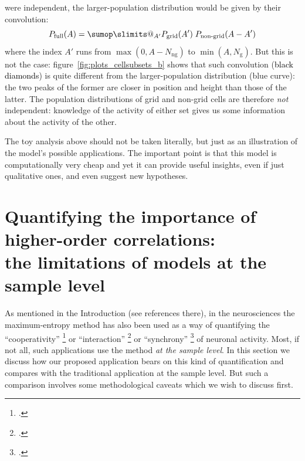\documentclass[\ifafour a4paper,12pt,\else a5paper,10pt,\fi%
onecolumn,oneside,article,%
british%
]{memoir}
\makeatletter
\theoremstyle{remark}
\theoremstyle{innote}
\def\sum{\DOTSI\sumop\slimits@}
\newcommand*{\citep}{\footcites}
\DeclarePairedDelimiter\set{\{}{\}}
\renewcommand*{\|}{\nonscript\,\vert\nonscript\;\mathopen{}}
\newcommand*{\eg}{{e.g.}}
\newcommand*{\yAv}{A}
\newcommand*{\yNg}{N_{\text{g}}}
\newcommand*{\yNng}{N_{\text{ng}}}
\newcommand*{\yA}{\yAv}%
\makeatother
\begin{document}
were independent, the larger-population distribution would be given by
their convolution:
\begin{equation}
  \label{eq:convolution}
  P_{\text{full}}(\yA) = \sum_{\yA'} P_{\text{grid}}(\yA')\;
  P_{\text{non-grid}}(\yA-\yA') %
\end{equation}
where the index $\yA'$ runs from $\max(0,\yA-\yNng)$ to $\min(\yA,\yNg)$.
But this is not the case: 
figure~\ref{fig:plots_cellsubsets_b} shows that such convolution
(\textcolor{black}{black diamonds}) is quite different from the
larger-population distribution (\textcolor{myblue}{blue curve}): the two
peaks of the former are closer in position and height than those of the
latter. The population distributions of grid and non-grid cells are
therefore \emph{not} independent: knowledge of the activity of either set
gives us some information about the activity of the other.

\medskip

The toy analysis above should not be taken literally, but just as an
illustration of the model's possible applications. The important point is
that this model is computationally very cheap and yet it can provide
useful insights, even if just qualitative ones, and even suggest new
hypotheses.




\section{Quantifying the importance of higher-order correlations:\\
  the limitations of models at the sample level}
\label{sec:marginalization}

As mentioned in the Introduction (see references there), in the
neurosciences the maximum-entropy method has also been used as a way of
quantifying the \enquote{cooperativity} \citep[\eg][]{gersteinetal1985} or
\enquote{interaction}
\citep[\eg][]{martignonetal1995,schneidmanetal2006,shlensetal2006} or
\enquote{synchrony} \citep[\eg][-- we're only citing early papers using
these terms]{bohteetal2000,amarietal2003} of neuronal activity. Most, if
not all, such applications use the method \emph{at the sample level}. In
this section we discuss how our proposed application bears on this kind of
quantification and compares with the traditional application at the sample
level. But such a comparison involves some methodological caveats which we
wish to discuss first.%
\end{document}
